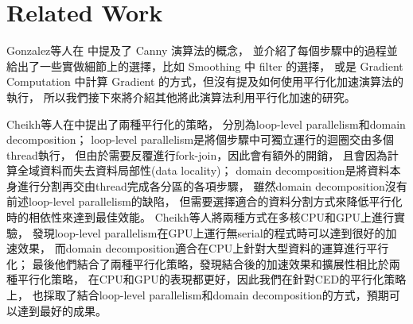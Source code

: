 \documentclass[sigconf,nonacm]{acmart}
\begin{document}





\section{Related Work}

Gonzalez等人在 \cite{gonzalez2018digital} 中提及了 Canny 演算法的概念，
並介紹了每個步驟中的過程並給出了一些實做細節上的選擇，比如 Smoothing 中 filter 的選擇，
或是 Gradient Computation 中計算 Gradient 的方式，但沒有提及如何使用平行化加速演算法的執行，
所以我們接下來將介紹其他將此演算法利用平行化加速的研究。

Cheikh等人在\cite{6328953}中提出了兩種平行化的策略，
分別為loop-level parallelism和domain decomposition；
loop-level parallelism是將個步驟中可獨立運行的迴圈交由多個thread執行，
但由於需要反覆進行fork-join，因此會有額外的開銷，
且會因為計算全域資料而失去資料局部性(data locality)；
domain decomposition是將資料本身進行分割再交由thread完成各分區的各項步驟，
雖然domain decomposition沒有前述loop-level parallelism的缺陷，
但需要選擇適合的資料分割方式來降低平行化時的相依性來達到最佳效能。
Cheikh等人將兩種方式在多核CPU和GPU上進行實驗，
發現loop-level parallelism在GPU上運行無serial的程式時可以達到很好的加速效果，
而domain decomposition適合在CPU上針對大型資料的運算進行平行化；
最後他們結合了兩種平行化策略，發現結合後的加速效果和擴展性相比於兩種平行化策略，
在CPU和GPU的表現都更好，因此我們在針對CED的平行化策略上，
也採取了結合loop-level parallelism和domain decomposition的方式，預期可以達到最好的成果。
\end{document}
